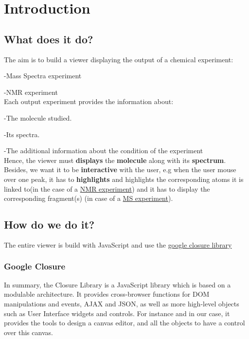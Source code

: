 \section{Introduction}
\subsection{What does it do?}
The aim is to build a viewer displaying the output of a chemical experiment:

-Mass Spectra experiment

-NMR experiment\\
Each output experiment provides the information about:

-The molecule studied.

-Its spectra.

-The additional information about the condition of the experiment\\
Hence, the viewer must \textbf{displays} the\textbf{ molecule} along with its \textbf{spectrum}. Besides, we want it to be \textbf{interactive} with the user, e.g when the user mouse over one peak, it has to \textbf{highlights} and highlights the corresponding atoms it is linked to(in the case of a \href{http://en.wikipedia.org/wiki/Nuclear\_magnetic\_resonance}{NMR experiment}) and it has to display the corresponding fragment(s) (in case of a \href{http://en.wikipedia.org/wiki/Mass\_spectrometry}{MS experiment}).
\subsection{How do we do it?}
The entire viewer is build with JavaScript and use the \href{http://code.google.com/closure/}{google closure library}

\subsubsection{Google Closure}

In summary, the Closure Library is a JavaScript library which is based on a modulable architecture. It provides cross-browser functions for DOM manipulations and events, AJAX and JSON, as well as more high-level objects such as User Interface widgets and controls.
For instance and in our case, it provides the tools to design a canvas editor, and all the objects to have a control over this canvas.
\clearpage
